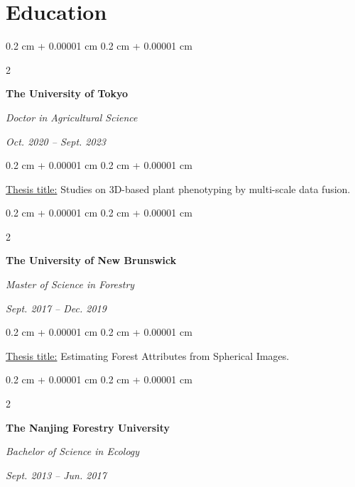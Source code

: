 \documentclass[10pt, a4paper]{article}
\newenvironment{highlights}{
    \begin{itemize}[
        topsep=0.10 cm,
        parsep=0.10 cm,
        partopsep=0pt,
        itemsep=0pt,
        leftmargin=0.4 cm + 10pt
    ]
}{
    \end{itemize}
} %
\newenvironment{onecolentry}{
    \begin{adjustwidth}{
        0.2 cm + 0.00001 cm
    }{
        0.2 cm + 0.00001 cm
    }
}{
    \end{adjustwidth}
} %
\newenvironment{twocolentry}[2][]{
    \onecolentry
    \def\secondColumn{#2}
    \setcolumnwidth{\fill, 4.5 cm}
    \begin{paracol}{2}
}{
    \switchcolumn \raggedleft \secondColumn
    \end{paracol}
    \endonecolentry
} %
\let\hrefWithoutArrow\href
\renewcommand{\href}[2]{\hrefWithoutArrow{#1}{\ifthenelse{\equal{#2}{}}{ }{#2 }\raisebox{.15ex}{\footnotesize \faExternalLink*}}}
\begin{document}
    \section{Education}
        
        \begin{twocolentry}{
            \textit{Oct. 2020 – Sept. 2023}}
            \textbf{The University of Tokyo}

            \textit{Doctor in Agricultural Science}
        \end{twocolentry}

        \vspace{0.10 cm}
        \begin{onecolentry}
            \underline{Thesis title:} Studies on 3D-based plant phenotyping by multi-scale data fusion.
        \end{onecolentry}

        \vspace{0.20 cm}

        \begin{twocolentry}{
            \textit{Sept. 2017 – Dec. 2019}}
            \textbf{The University of New Brunswick}

            \textit{Master of Science in Forestry}
        \end{twocolentry}

        \vspace{0.10 cm}
        \begin{onecolentry}
            \underline{Thesis title:} Estimating Forest Attributes from Spherical Images.
        \end{onecolentry}

        \vspace{0.20 cm}

        \begin{twocolentry}{
            \textit{Sept. 2013 – Jun. 2017}}
            \textbf{The Nanjing Forestry University}

            \textit{Bachelor of Science in Ecology}
        \end{twocolentry}
\end{document}
